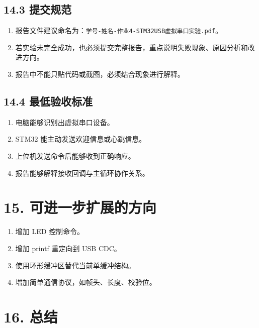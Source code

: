 \documentclass[
  chinese,
  UTF8,
  oneside,
  openany]{ctexbook}
\providecommand{\tightlist}{%
  \setlength{\itemsep}{0pt}\setlength{\parskip}{0pt}}
\begin{document}
\subsection{14.3 提交规范}\label{ux63d0ux4ea4ux89c4ux8303-3}

\begin{enumerate}
\def\labelenumi{\arabic{enumi}.}
\tightlist
\item
  报告文件建议命名为：\texttt{学号-姓名-作业4-STM32USB虚拟串口实验.pdf}。
\item
  若实验未完全成功，也必须提交完整报告，重点说明失败现象、原因分析和改进方向。
\item
  报告中不能只贴代码或截图，必须结合现象进行解释。
\end{enumerate}

\subsection{14.4
最低验收标准}\label{ux6700ux4f4eux9a8cux6536ux6807ux51c6-3}

\begin{enumerate}
\def\labelenumi{\arabic{enumi}.}
\tightlist
\item
  电脑能够识别出虚拟串口设备。
\item
  STM32 能主动发送欢迎信息或心跳信息。
\item
  上位机发送命令后能够收到正确响应。
\item
  报告能够解释接收回调与主循环协作关系。
\end{enumerate}

\section{15.
可进一步扩展的方向}\label{ux53efux8fdbux4e00ux6b65ux6269ux5c55ux7684ux65b9ux5411}

\begin{enumerate}
\def\labelenumi{\arabic{enumi}.}
\tightlist
\item
  增加 LED 控制命令。
\item
  增加 printf 重定向到 USB CDC。
\item
  使用环形缓冲区替代当前单缓冲结构。
\item
  增加简单通信协议，如帧头、长度、校验位。
\end{enumerate}

\section{16. 总结}\label{ux603bux7ed3}
\end{document}
